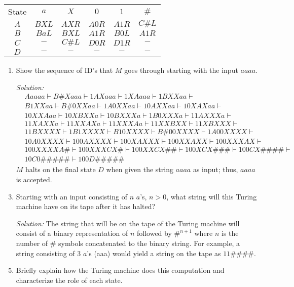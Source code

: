 \documentclass[]{article}
\begin{document}
\begin{enumerate}
\begin{tabular}{c|c|c|c|c|c }
State & $a$   & $X$    & $0$   & $1$   & $\#$   \\
$A$   & $BXL$ & $AXR$  & $A0R$ & $A1R$ & $C\#L$ \\
$B$   & $BaL$ & $BXL$  & $A1R$ & $B0L$ & $A1R$  \\
$C$   & $-$   & $C\#L$ & $D0R$ & $D1R$ & $-$    \\
$D$   & $-$   & $-$    & $-$   & $-$   & $-$
\end{tabular}
\begin{enumerate}
\item Show the sequence of ID's that $M$ goes through starting with the input
$aaaa$.
\item[\emph{Solution:}]
\begin{align*}
&Aaaaa\vdash{B\#Xaaa}\vdash{1AXaaa}\vdash{1XAaaa}\vdash{1BXXaa}\vdash\\&B1XXaa\vdash{B\#0XXaa}\vdash{1A0XXaa}\vdash{10AXXaa}\vdash{10XAXaa}\vdash\\&10XXAaa\vdash{10XBXXa}\vdash{10BXXXa}\vdash{1B0XXXa}\vdash{11AXXXa}\vdash\\&11XAXXa\vdash{11XXAXa}\vdash{11XXXAa}\vdash{11XXBXX}\vdash{11XBXXX}\vdash\\&11BXXXX\vdash{1B1XXXX}\vdash{B10XXXX}\vdash{B\#00XXXX}\vdash{1A00XXXX}\vdash\\&10A0XXXX\vdash{100AXXXX}\vdash{100XAXXX}\vdash{100XXAXX}\vdash{100XXXAX}\vdash\\&100XXXXA\#\vdash{100XXXCX\#}\vdash{100XXCX\#\#}\vdash{100XCX\#\#\#}\vdash{100CX\#\#\#\#}\vdash\\&10C0\#\#\#\#\#\vdash{100D\#\#\#\#\#}
\end{align*}
$M$ halts on the final state $D$ when given the string $aaaa$ as input; thus, $aaaa$ is accepted.

\item Starting with an input consisting of $n$ $a$'s, $n > 0$, what string will
this Turing machine have on its tape after it has halted?
\item[\emph{Solution:}] The string that will be on the tape of the Turing machine will consist of a binary representation of $n$ followed by $\#^{n+1}$ where $n$ is the number of $\#$ symbols concatenated to the binary string. For example, a string consisting of 3 $a$'s (aaa) would yield a string on the tape as $11\#\#\#\#$.

\item Briefly explain how the Turing machine does this computation and
characterize the role of each state.


\end{enumerate}
\end{enumerate}
\end{document}
